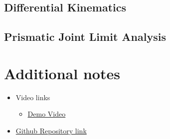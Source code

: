 \documentclass{report}
\begin{document}
\subsection{Differential Kinematics}

\subsection{Prismatic Joint Limit Analysis} 




\section{Additional notes}

\begin{itemize}

    \item Video links \begin{itemize}
        \item \href{}{Demo Video}
    \end{itemize}

    \item \href{https://github.com/brunofavs/TP2_RI}{Github Repository link}

\end{itemize}
\end{document}
